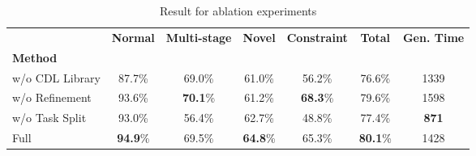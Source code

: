 \begin{table*}[ht]
    \centering
    \scriptsize
    \renewcommand{\arraystretch}{1.5}
    \begin{adjustbox}{width=\textwidth}
    \begin{tabular}{l c c c c c c}
        \hline
                        & \textbf{Normal} & \textbf{Multi-stage} & \textbf{Novel} & \textbf{Constraint} & \textbf{Total} & \textbf{Gen. Time}\\ 
        \textbf{Method} & & & & & & \\ \hline
        w/o CDL Library     & 87.7\%& 69.0\%& 61.0\%& 56.2\%& 76.6\%& 1339\\
        w/o Refinement      & 93.6\%& \textbf{70.1}\%& 61.2\%& \textbf{68.3}\%& 79.6\%& 1598\\
        w/o Task Split      & 93.0\%& 56.4\%& 62.7\%& 48.8\%& 77.4\%& \textbf{871}\\
        Full                & \textbf{94.9}\%& 69.5\%& \textbf{64.8}\%& 65.3\%& \textbf{80.1}\%& 1428\\
        \hline
    \end{tabular}
    \end{adjustbox}
    \caption{Result for ablation experiments}
    \label{tab:ablation}
\end{table*}